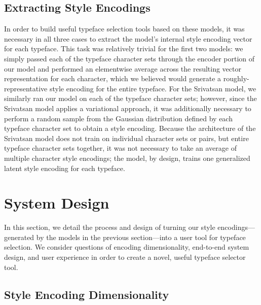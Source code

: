 \subsection{Extracting Style Encodings}

In order to build useful typeface selection tools based on these models, it was necessary in all three cases to extract the model's internal style encoding vector for each typeface. This task was relatively trivial for the first two models: we simply passed each of the typeface character sets through the encoder portion of our model and performed an elementwise average across the resulting vector representation for each character, which we believed would generate a roughly-representative style encoding for the entire typeface. For the Srivatsan model, we similarly ran our model on each of the typeface character sets; however, since the Srivatsan model applies a variational approach, it was additionally necessary to perform a random sample from the Gaussian distribution defined by each typeface character set to obtain a style encoding. Because the architecture of the Srivatsan model does not train on individual character sets or pairs, but entire typeface character sets together, it was not necessary to take an average of multiple character style encodings; the model, by design, trains one generalized latent style encoding for each typeface.

\section{System Design}

In this section, we detail the process and design of turning our style encodings—generated by the models in the previous section—into a user tool for typeface selection. We consider questions of encoding dimensionality, end-to-end system design, and user experience in order to create a novel, useful typeface selector tool.

\subsection{Style Encoding Dimensionality}

